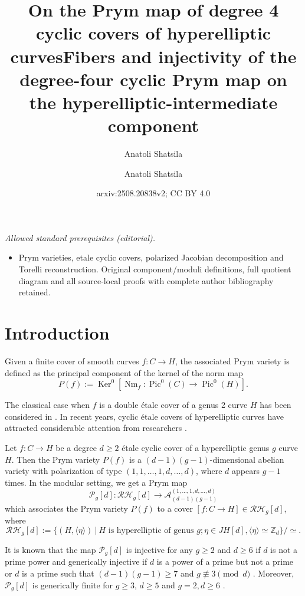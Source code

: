 \documentclass{article}
\title{On the Prym map of degree 4 cyclic covers of hyperelliptic curves}
\author{Anatoli Shatsila}
\title{Fibers and injectivity of the degree-four cyclic Prym map on the hyperelliptic-intermediate component}
\author{Anatoli Shatsila}
\date{arxiv:2508.20838v2; CC BY 4.0}
\numberwithin{equation}{section}
\DeclareMathOperator{\Nm}{Nm}
\DeclareMathOperator{\Pic}{Pic}
\DeclareMathOperator{\Ker}{Ker}
\begin{document}
\maketitle
\noindent\textit{Allowed standard prerequisites (editorial).}\begin{itemize}
\item Prym varieties, etale cyclic covers, polarized Jacobian decomposition and Torelli reconstruction. Original component/moduli definitions, full quotient diagram and all source-local proofs with complete author bibliography retained.
\end{itemize}\medskip
\section{Introduction}

Given a finite cover of smooth curves $f: C \to H$, the associated Prym variety is defined as the principal component of the kernel of the norm map $$P(f) := \Ker^0[\Nm_f: \Pic^0(C) \to \Pic^0(H)].$$ 

The classical case when $f$ is a double \'etale cover of a genus 2 curve $H$ has been considered in \cite{MR379510}. In recent years, cyclic étale covers of hyperelliptic curves have attracted considerable attention from researchers \cite{MR2023955, MR3519095,  MR4093071, MR4747961, naranjo2024simplicityjacobiansautomorphisms, borówka2025prymmapscycliccoverings}. 

Let $f: C \to H$ be a degree $d \geq 2$ \'etale cyclic cover of a hyperelliptic genus $g$ curve $H$. Then the Prym variety $P(f)$ is a $(d-1)(g-1)$-dimensional abelian variety with polarization of type $(1,1,\ldots, 1, d, \ldots, d)$, where $d$ appears $g-1$ times. In the modular setting, we get a Prym map $$\mathcal{P}_g[d]: \mathcal{RH}_g[d] \to \mathcal{A}_{(d-1)(g-1)}^{(1,\ldots,1,d,\ldots,d)}$$ which associates the Prym variety $P(f)$ to a cover $[f: C \to H] \in \mathcal{RH}_g[d]$, where $$\mathcal{RH}_g[d] := \{(H, \langle\eta\rangle) \: | \: H \text{ is hyperelliptic of genus } g; \eta\in JH[d], \langle \eta \rangle \simeq \mathbb{Z}_d\}/\simeq.$$ 

It is known that the map $\mathcal{P}_g[d]$ is injective for any $g \geq 2$ and $d \geq 6$ if $d$ is not a prime power and generically injective if $d$ is a power of a prime but not a prime \cite{borówka2025prymmapscycliccoverings} or $d$ is a prime such that $(d-1)(g-1) \geq 7$ and $g \not\equiv 3 \pmod d$ \cite{naranjo2024simplicityjacobiansautomorphisms}. Moreover, $\mathcal{P}_g[d]$ is generically finite for $g \geq 3$, $d \geq 5$ and $g=2, d\geq 6$ \cite{naranjo2024simplicityjacobiansautomorphisms, MR4093071}. 
\end{document}
